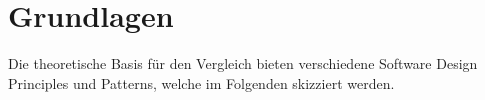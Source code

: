 \section{Grundlagen}
Die theoretische Basis für den Vergleich bieten verschiedene Software Design Principles und Patterns, welche
im Folgenden skizziert werden.



